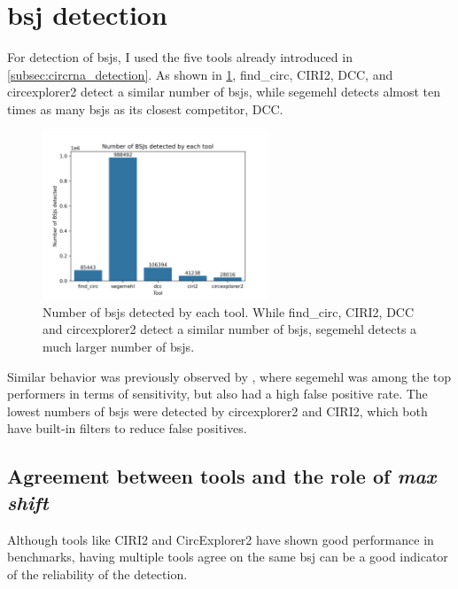 \section{\Acrfull{bsj} detection}

For detection of \glspl{bsj}, I used the five tools already introduced in
\cref{subsec:circrna_detection}.
As shown in \cref{fig:detection_bars}, find\_circ, CIRI2, DCC, and
circexplorer2 detect a similar number of \glspl{bsj}, while segemehl detects
almost ten times as many \glspl{bsj} as its closest competitor, DCC.

\begin{figure}[H] \centering

    \includegraphics[width=0.6\textwidth]{chapters/4_results_and_discussion/figures/detection/n_bsjs_detected.png}
    \caption{Number of \glspl{bsj} detected by each tool.
        While find\_circ, CIRI2, DCC and circexplorer2 detect a similar number of
        \glspl{bsj}, segemehl detects a much larger number of \glspl{bsj}.
    }
    \label{fig:detection_bars}
\end{figure}
Similar behavior was previously observed by \textcite{zeng_comprehensive_2017},
where segemehl was among the top performers in terms of sensitivity, but also
had a high false positive rate.
The lowest numbers of \glspl{bsj} were detected by circexplorer2 and CIRI2,
which both have built-in filters to reduce false
positives\supercite{zhang_diverse_2016,gao_circular_2018}.

\subsection{Agreement between tools and the role of \textit{max shift}}

Although tools like CIRI2 and CircExplorer2 have shown good performance in
benchmarks, having multiple tools agree on the same \gls{bsj} can be a good
indicator of the reliability of the detection.

